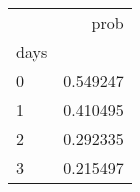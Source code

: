 \begin{tabular}{lr}
\toprule
{} &      prob \\
days &           \\
\midrule
0    &  0.549247 \\
1    &  0.410495 \\
2    &  0.292335 \\
3    &  0.215497 \\
\bottomrule
\end{tabular}
